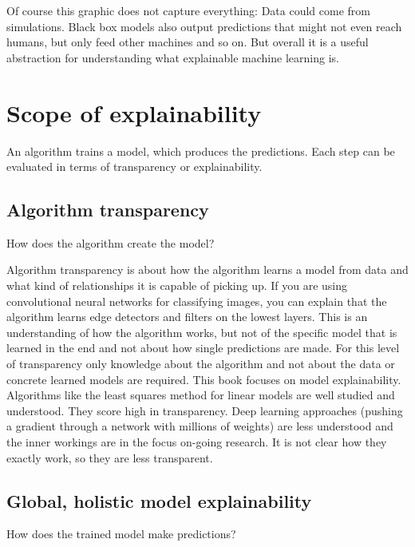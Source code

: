 \documentclass[12pt,]{krantz}
\theoremstyle{definition}
\theoremstyle{definition}
\theoremstyle{definition}
\theoremstyle{remark}
\begin{document}
Of course this graphic does not capture everything: Data could come from
simulations. Black box models also output predictions that might not
even reach humans, but only feed other machines and so on. But overall
it is a useful abstraction for understanding what explainable machine
learning is.

\section{Scope of explainability}\label{scope-of-explainability}

An algorithm trains a model, which produces the predictions. Each step
can be evaluated in terms of transparency or explainability.

\subsection{Algorithm transparency}\label{algorithm-transparency}

How does the algorithm create the model?

Algorithm transparency is about how the algorithm learns a model from
data and what kind of relationships it is capable of picking up. If you
are using convolutional neural networks for classifying images, you can
explain that the algorithm learns edge detectors and filters on the
lowest layers. This is an understanding of how the algorithm works, but
not of the specific model that is learned in the end and not about how
single predictions are made. For this level of transparency only
knowledge about the algorithm and not about the data or concrete learned
models are required. This book focuses on model explainability.
Algorithms like the least squares method for linear models are well
studied and understood. They score high in transparency. Deep learning
approaches (pushing a gradient through a network with millions of
weights) are less understood and the inner workings are in the focus
on-going research. It is not clear how they exactly work, so they are
less transparent.

\subsection{Global, holistic model
explainability}\label{global-holistic-model-explainability}

How does the trained model make predictions?
\end{document}
